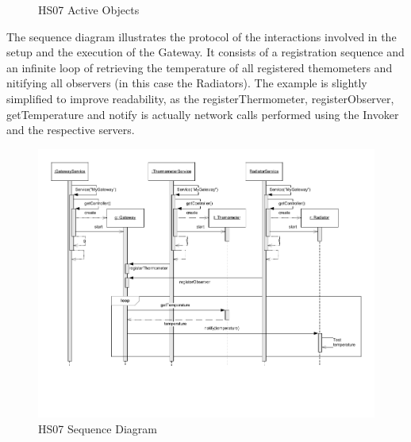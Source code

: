 \documentclass[a4paper,10pt]{article}
\begin{document}
\begin{figure}[!htb]
\caption{HS07 Active Objects}
\label{fig:cc_ao}
\end{figure}
The sequence diagram illustrates the protocol of the interactions involved in the setup and the execution of the Gateway. It consists of a registration sequence and an infinite loop of retrieving the temperature of all registered themometers and nitifying all observers (in this case the Radiators). The example is slightly simplified to improve readability, as the registerThermometer, registerObserver, getTemperature and notify is actually network calls performed using the Invoker and the respective servers.
\begin{figure}[!htb]
\includegraphics[viewport=0 10 500 650,scale=0.3]{figures/sequence.pdf}
\caption{HS07 Sequence Diagram}
\label{fig:sequence}
\end{figure}
\end{document}
